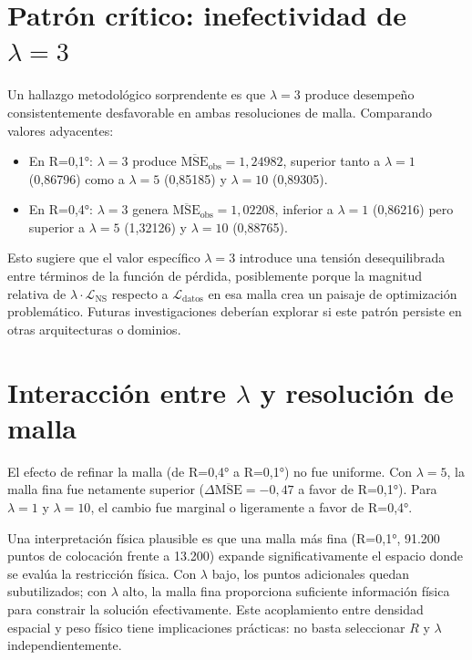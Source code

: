 \section{Patrón crítico: inefectividad de \texorpdfstring{$\lambda = 3$}{lambda = 3}}

Un hallazgo metodológico sorprendente es que $\lambda=3$ produce desempeño consistentemente desfavorable en ambas resoluciones de malla. Comparando valores adyacentes:
\begin{itemize}
	\item En R=0,1°: $\lambda=3$ produce $\overline{\text{MSE}}_{\text{obs}} = 1,24982$, superior tanto a $\lambda=1$ (0,86796) como a $\lambda=5$ (0,85185) y $\lambda=10$ (0,89305).
	\item En R=0,4°: $\lambda=3$ genera $\overline{\text{MSE}}_{\text{obs}} = 1,02208$, inferior a $\lambda=1$ (0,86216) pero superior a $\lambda=5$ (1,32126) y $\lambda=10$ (0,88765).
\end{itemize}

Esto sugiere que el valor específico $\lambda=3$ introduce una tensión desequilibrada entre términos de la función de pérdida, posiblemente porque la magnitud relativa de $\lambda \cdot \mathcal{L}_{\text{NS}}$ respecto a $\mathcal{L}_{\text{datos}}$ en esa malla crea un paisaje de optimización problemático. Futuras investigaciones deberían explorar si este patrón persiste en otras arquitecturas o dominios.

\section{Interacción entre \texorpdfstring{$\lambda$}{lambda} y resolución de malla}

El efecto de refinar la malla (de R=0,4° a R=0,1°) no fue uniforme. Con $\lambda=5$, la malla fina fue netamente superior ($\Delta\overline{\text{MSE}} = -0{,}47$ a favor de R=0,1°). Para $\lambda=1$ y $\lambda=10$, el cambio fue marginal o ligeramente a favor de R=0,4°.

Una interpretación física plausible es que una malla más fina (R=0,1°, 91.200 puntos de colocación frente a 13.200) expande significativamente el espacio donde se evalúa la restricción física. Con $\lambda$ bajo, los puntos adicionales quedan subutilizados; con $\lambda$ alto, la malla fina proporciona suficiente información física para constrair la solución efectivamente. Este acoplamiento entre densidad espacial y peso físico tiene implicaciones prácticas: no basta seleccionar $R$ y $\lambda$ independientemente.

